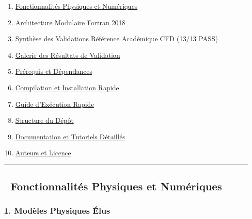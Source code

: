 \documentclass[
  french,
]{article}
\providecommand{\tightlist}{%
  \setlength{\itemsep}{0pt}\setlength{\parskip}{0pt}}
\begin{document}
\begin{enumerate}
\def\labelenumi{\arabic{enumi}.}
\tightlist
\item
  \hyperref[-fonctionnalituxe9s-physiques-et-numuxe9riques]{Fonctionnalités
  Physiques et Numériques}
\item
  \hyperref[-architecture-modulaire-fortran-2018]{Architecture Modulaire
  Fortran 2018}
\item
  \hyperref[-synthuxe8se-des-validations-Ruxe9fuxe9renceux5cux2520Acaduxe9mique-210-1313-pass]{Synthèse
  des Validations Référence Académique CFD (13/13 PASS)}
\item
  \hyperref[-galerie-des-ruxe9sultats-de-validation]{Galerie des
  Résultats de Validation}
\item
  \hyperref[-pruxe9requis-et-duxe9pendances]{Prérequis et Dépendances}
\item
  \hyperref[-compilation-et-installation-rapide]{Compilation et
  Installation Rapide}
\item
  \hyperref[-guide-dexuxe9cution-rapide]{Guide d'Exécution Rapide}
\item
  \hyperref[-structure-du-duxe9puxf4t]{Structure du Dépôt}
\item
  \hyperref[-documentation-et-tutoriels-duxe9tailluxe9s]{Documentation
  et Tutoriels Détaillés}
\item
  \hyperref[-auteurs-et-licence]{Auteurs et Licence}
\end{enumerate}

\begin{center}\rule{0.5\linewidth}{0.5pt}\end{center}

\subsection{🚀 Fonctionnalités Physiques et
Numériques}\label{fonctionnalituxe9s-physiques-et-numuxe9riques}

\subsubsection{1. Modèles Physiques
Élus}\label{moduxe8les-physiques-uxe9lus}
\end{document}
